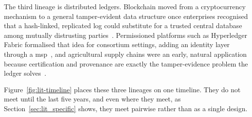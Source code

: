 \documentclass[12pt,a4paper,oneside]{book}
\begin{document}
The third lineage is distributed ledgers. Blockchain moved from a
cryptocurrency mechanism to a general tamper-evident data structure once
enterprises recognised that a hash-linked, replicated log could substitute
for a trusted central database among mutually
distrusting parties~\cite{christidis2016blockchain, gubbi2013internet}.
Permissioned platforms such as Hyperledger Fabric formalised that idea for
consortium settings, adding an identity layer through a
\gls{msp}~\cite{jayaram2023hyperledger, hyperledger2022msp}, and agricultural
supply chains were an early, natural application because certification and
provenance are exactly the tamper-evidence problem the ledger
solves~\cite{tian2016agri, xu2016blockchain, salah2019blockchain}.

Figure~\ref{fig:lit-timeline} places these three lineages on one timeline.
They do not meet until the last five years, and even where they meet, as
Section~\ref{sec:lit_specific} shows, they meet pairwise rather than as a
single design.
\end{document}
